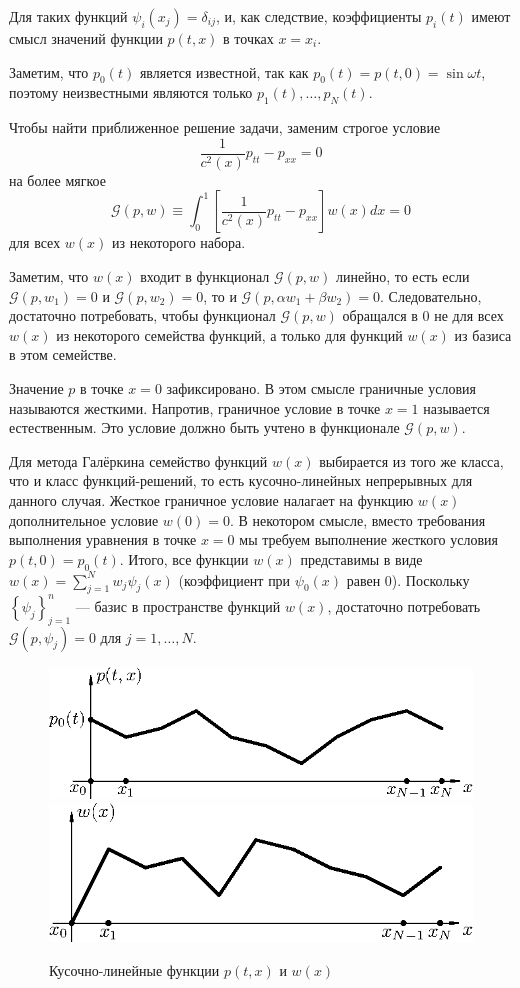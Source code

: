 \documentclass[12pt]{article}
\begin{document}
Для таких функций $\psi_i(x_j) = \delta_{ij}$, и, как следствие, коэффициенты $p_i(t)$ имеют
смысл значений функции $p(t, x)$ в точках $x = x_i$.

Заметим, что $p_0(t)$ является известной, так как $p_0(t) = p(t, 0) = \sin \omega t$, поэтому неизвестными являются только $p_1(t), \dots, p_N(t)$.

Чтобы найти приближенное решение задачи, заменим строгое условие
\[
\frac{1}{c^2(x)} p_{tt} - p_{xx} = 0
\]
на более мягкое
\[
\mathcal{G}(p, w) \equiv \int_0^1 \left[\frac{1}{c^2(x)} p_{tt} - p_{xx}\right] w(x) dx = 0
\]
для всех $w(x)$ из некоторого набора.

Заметим, что $w(x)$ входит в функционал
$\mathcal{G}(p, w)$ линейно, то есть если $\mathcal{G}(p, w_1) = 0$ и
$\mathcal{G}(p, w_2) = 0$, то и $\mathcal{G}(p, \alpha w_1 + \beta w_2) = 0$.
Следовательно, достаточно потребовать, чтобы функционал $\mathcal{G}(p, w)$
обращался в $0$ не для всех $w(x)$ из некоторого семейства функций, а только для
функций $w(x)$ из базиса в этом семействе.

Значение $p$ в точке $x = 0$ зафиксировано. В этом смысле граничные условия
называются жесткими. Напротив, граничное условие в точке $x = 1$ называется
естественным. Это условие должно быть учтено в функционале $\mathcal{G}(p, w)$.

Для метода Галёркина семейство функций $w(x)$ выбирается из того же класса, что
и класс функций-решений, то есть кусочно-линейных непрерывных для данного случая. Жесткое
граничное условие налагает на функцию $w(x)$ дополнительное условие $w(0) = 0$.
В некотором смысле, вместо требования выполнения уравнения в точке $x = 0$ мы
требуем выполнение жесткого условия $p(t, 0) = p_0(t)$. Итого, все функции
$w(x)$ представимы в виде $w(x) = \sum_{j=1}^N w_j \psi_j(x)$ (коэффициент при
$\psi_0(x)$ равен $0$). Поскольку $\left\{\psi_j\right\}_{j = 1}^n$ --- базис в
пространстве функций $w(x)$, достаточно потребовать $\mathcal{G}(p, \psi_j) = 0$
для $j = 1, \dots, N$.

\begin{figure}[!ht]
\centering
\includegraphics[width=.45\textwidth]{func-0.eps}\quad
\includegraphics[width=.45\textwidth]{func-1.eps}
\caption{Кусочно-линейные функции $p(t,x)$ и $w(x)$}
\end{figure}
\end{document}
